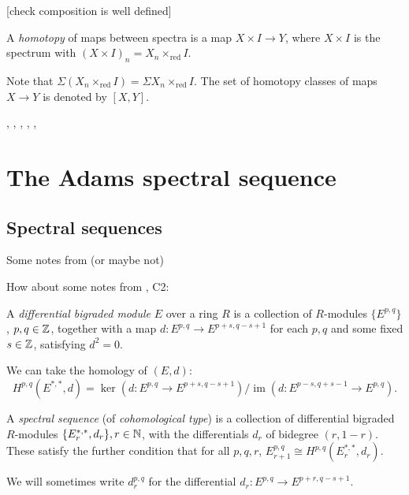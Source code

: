 \documentclass{MetricNotes2023}
\def\inte{\ensuremath\mathbb{Z}}
\def\nat{\ensuremath\mathbb{N}}
\DeclareMathOperator{\im}{im}
\begin{document}
[check composition is well defined]

\begin{definition}
A \textit{homotopy} of maps between spectra is a map \(X\times I \to Y\), where \(X\times I\) is the spectrum with \((X\times I)_n=X_n\times_{\text{red}} I\).
\end{definition}

Note that \(\Sigma(X_n\times_{\text{red}}I)=\Sigma X_n\times_{\text{red}}I\). The set of homotopy classes of maps \(X\to Y\) is denoted by \([X,Y]\). 

\autocite{stable_homotopy}, \autocite{cobordism}, \autocite{ass}, \autocite{spectra}, \autocite{foundations}, \autocite{hatcher5}

\section{The Adams spectral sequence}

\subsection{Spectral sequences}

Some notes from \autocite{ass} (or maybe not)

How about some notes from \autocite{spectral_sequences}, C2:

\begin{definition}
A \textit{differential bigraded module} \(E\) over a ring \(R\) is a collection of \(R\)-modules \(\{E^{p, q}\}\), \(p, q\in \inte\), together with a map \(d : E^{p, q} \to E^{p+s, q-s+1}\) for each \(p, q\) and some fixed \(s \in \inte\), satisfying \(d^2=0\). 
\end{definition}

We can take the homology of \((E, d)\):
\[H^{p, q}(E^{*, *}, d)=\ker(d : E^{p, q}\to E^{p+s, q-s+1})/\im(d : E^{p-s, q+s-1}\to E^{p, q}).\]

\begin{definition}
A \textit{spectral sequence} (of \textit{cohomological type}) is a collection of differential bigraded \(R\)-modules \(\{E^{*, *}_r, d_r\}, r \in \nat\), with the differentials \(d_r\) of bidegree \((r, 1-r)\). These satisfy the further condition that for all \(p, q, r\), \(E^{p, q}_{r+1}\cong H^{p, q}(E_r^{*, *}, d_r)\).
\end{definition}

We will sometimes write \(d^{p, q}_r\) for the differential \(d_r : E^{p, q}\to E^{p+r,q-s+1}\). 
\end{document}
